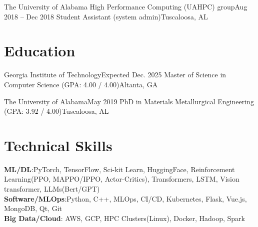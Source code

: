 \documentclass[letterpaper,11pt]{article}
\begin{document}
      \resumeSubheading
      {The University of Alabama High Performance Computing (UAHPC) group}{Aug 2018 -- Dec 2018}
      {Student Assistant (system admin)}{Tuscaloosa, AL}
      \resumeItemListStart
      \resumeItemListEnd

  \resumeSubHeadingListEnd

\section{Education}
    \resumeSubHeadingListStart

    \resumeSubheading
    {Georgia Institute of Technology}{Expected Dec. 2025}
    {Master of Science in Computer Science (GPA: 4.00 / 4.00)}{Altanta, GA }
    \resumeItemListStart
    \resumeItemListEnd

    \resumeSubheading
    {The University of Alabama}{May 2019}
    {PhD in Materials Metallurgical Engineering (GPA: 3.92 / 4.00)}{Tuscaloosa, AL }
    \resumeItemListStart
    \resumeItemListEnd

    \resumeSubHeadingListEnd

\section{Technical Skills}
    \begin{itemize}[leftmargin=0.15in, label={}]
	\small{\item{
		\textbf{ML/DL}{:PyTorch, TensorFlow, Sci-kit Learn, HuggingFace, Reinforcement Learning(PPO, MAPPO/IPPO, Actor-Critics), Transformers, LSTM, Vision transformer, LLMs(Bert/GPT) } \\
		\textbf{Software/MLOps}{:Python, C++, MLOps, CI/CD, Kubernetes, Flask, Vue.js, MongoDB, Qt, Git} \\
    \textbf{Big Data/Cloud}{: AWS, GCP, HPC Clusters(Linux), Docker, Hadoop, Spark} \\
	}}
    \end{itemize}
\end{document}
